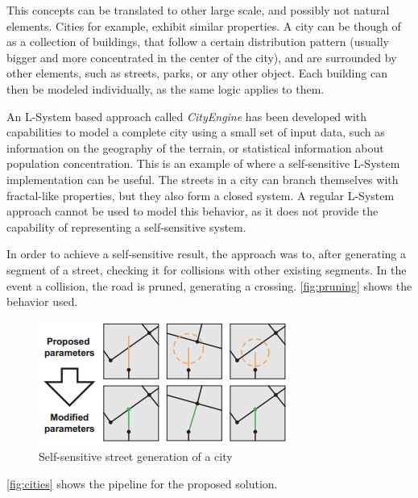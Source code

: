 \documentclass{acmtog}
\begin{document}
This concepts can be translated to other large scale, and possibly not natural elements. Cities for example, exhibit similar properties. A city can be though of as a collection of buildings, that follow a certain distribution pattern (usually bigger and more concentrated in the center of the city), and are surrounded by other elements, such as streets, parks, or any other object. Each building can then be modeled individually, as the same logic applies to them.

An L-System based approach called \emph{CityEngine} has been developed with capabilities to model a complete city using a small set of input data, such as information on the geography of the terrain, or statistical information about population concentration. This is an example of where a self-sensitive L-System implementation can be useful. The streets in a city can branch themselves with fractal-like properties, but they also form a closed system. A regular L-System approach cannot be used to model this behavior, as it does not provide the capability of representing a self-sensitive system.

In order to achieve a self-sensitive result, the approach was to, after generating a segment of a street, checking it for collisions with other existing segments. In the event a collision, the road is pruned, generating a crossing. \autoref{fig:pruning} shows the behavior used.

\begin{figure}[!htp]
  \begin{center}
    \includegraphics[width=0.7\columnwidth]{images/12_selfsensitive}
    \caption{Self-sensitive street generation of a city \label{fig:pruning}}
    \end{center}
\end{figure}

\autoref{fig:cities} shows the pipeline for the proposed solution.
\end{document}
